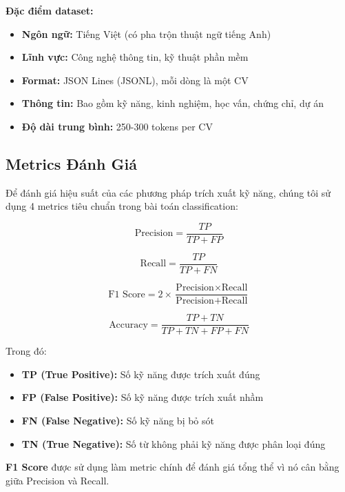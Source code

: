 \textbf{Đặc điểm dataset:}
\begin{itemize}
    \item \textbf{Ngôn ngữ:} Tiếng Việt (có pha trộn thuật ngữ tiếng Anh)
    \item \textbf{Lĩnh vực:} Công nghệ thông tin, kỹ thuật phần mềm
    \item \textbf{Format:} JSON Lines (JSONL), mỗi dòng là một CV
    \item \textbf{Thông tin:} Bao gồm kỹ năng, kinh nghiệm, học vấn, chứng chỉ, dự án
    \item \textbf{Độ dài trung bình:} 250-300 tokens per CV
\end{itemize}

\subsection{Metrics Đánh Giá}

Để đánh giá hiệu suất của các phương pháp trích xuất kỹ năng, chúng tôi sử dụng 4 metrics tiêu chuẩn trong bài toán classification:

\begin{equation}
\text{Precision} = \frac{TP}{TP + FP}
\end{equation}

\begin{equation}
\text{Recall} = \frac{TP}{TP + FN}
\end{equation}

\begin{equation}
\text{F1 Score} = 2 \times \frac{\text{Precision} \times \text{Recall}}{\text{Precision} + \text{Recall}}
\end{equation}

\begin{equation}
\text{Accuracy} = \frac{TP + TN}{TP + TN + FP + FN}
\end{equation}

Trong đó:
\begin{itemize}
    \item \textbf{TP (True Positive):} Số kỹ năng được trích xuất đúng
    \item \textbf{FP (False Positive):} Số kỹ năng được trích xuất nhầm
    \item \textbf{FN (False Negative):} Số kỹ năng bị bỏ sót
    \item \textbf{TN (True Negative):} Số từ không phải kỹ năng được phân loại đúng
\end{itemize}

\textbf{F1 Score} được sử dụng làm metric chính để đánh giá tổng thể vì nó cân bằng giữa Precision và Recall.

